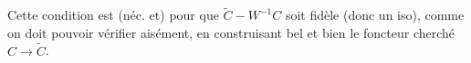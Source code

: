 
Cette condition est (néc. et)  pour que $\widetilde C\mathbin{-}W^{-1}C$ soit fidèle (donc un iso), comme on doit pouvoir vérifier aisément, en construisant bel et bien le foncteur cherché $C\longrightarrow\widetilde C$.

